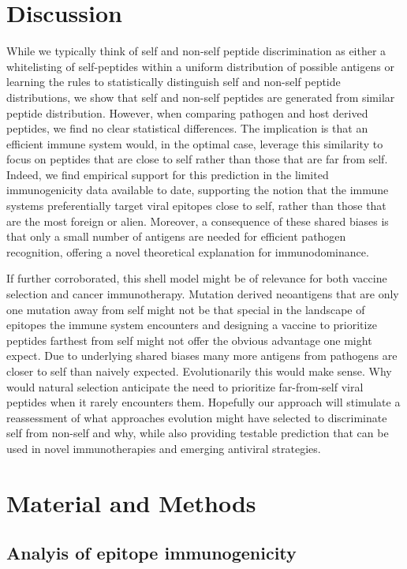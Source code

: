\documentclass[superscriptaddress,twocolumn,pre]{revtex4}
\newcommand{\<}{\langle}
\renewcommand{\>}{\rangle}
\begin{document}
\section{Discussion}

While we typically think of self and non-self peptide discrimination as either a whitelisting of self-peptides within a uniform distribution of possible antigens or learning the rules to statistically distinguish self and non-self peptide distributions, we show that self and non-self peptides are generated from similar peptide distribution. However, when comparing pathogen and host derived peptides, we find no clear statistical differences. The implication is that an efficient immune system would, in the optimal case, leverage this similarity to focus on peptides that are close to self rather than those that are far from self. Indeed, we find empirical support for this prediction in the limited immunogenicity data available to date, supporting the notion that the immune systems preferentially target viral epitopes close to self, rather than those that are the most foreign or alien. Moreover, a consequence of these shared biases is that only a small number of antigens are needed for efficient pathogen recognition, offering a novel theoretical explanation for immunodominance.

If further corroborated, this shell model might be of relevance for both vaccine selection and cancer immunotherapy. Mutation derived neoantigens that are only one mutation away from self might not be that special in the landscape of epitopes the immune system encounters and designing a vaccine to prioritize peptides farthest from self might not offer the obvious advantage one might expect. Due to underlying shared biases many more antigens from pathogens are closer to self than naively expected. Evolutionarily this would make sense. Why would natural selection anticipate the need to prioritize far-from-self viral peptides when it rarely encounters them. Hopefully our approach will stimulate a reassessment of what approaches evolution might have selected to discriminate self from non-self and why, while also providing testable prediction that can be used in novel immunotherapies and emerging antiviral strategies.

\section{Material and Methods}

\subsection{Analyis of epitope immunogenicity}
\end{document}

